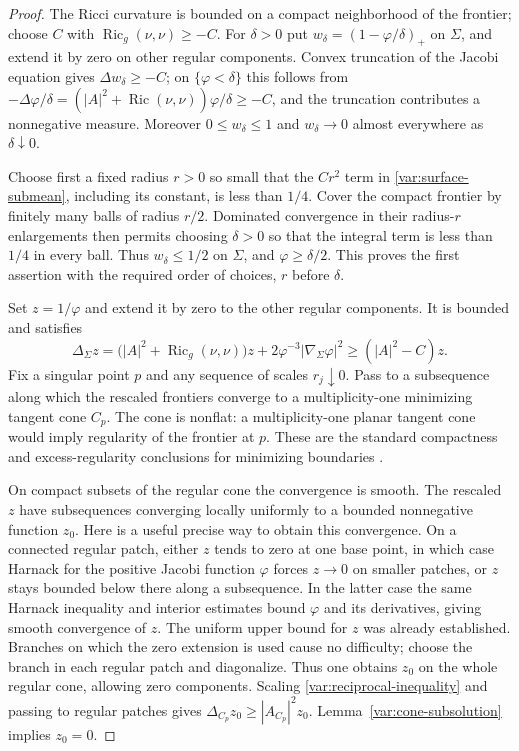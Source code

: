 \begin{proof}
The Ricci curvature is bounded on a compact neighborhood of the
frontier; choose $C$ with $\operatorname{Ric}_g(\nu,\nu)\geq-C$.
For $\delta>0$ put $w_\delta=(1-\varphi/\delta)_+$ on $\Sigma$,
and extend it by zero on other regular components.  Convex
truncation of the Jacobi equation gives
$\Delta w_\delta\geq-C$; on $\{\varphi<\delta\}$ this follows
from $-\Delta\varphi/\delta=(|A|^2+\operatorname{Ric}(\nu,\nu))
\varphi/\delta\geq-C$, and the truncation contributes a nonnegative
measure.  Moreover $0\leq w_\delta\leq1$ and $w_\delta\to0$
almost everywhere as $\delta\downarrow0$.

Choose first a fixed radius $r>0$ so small that the $Cr^2$ term
in \eqref{var:surface-submean}, including its constant, is less
than $1/4$.  Cover the compact frontier by finitely many balls
of radius $r/2$.  Dominated convergence in their radius-$r$
enlargements then permits choosing $\delta>0$ so that the integral
term is less than $1/4$ in every ball.  Thus $w_\delta\leq1/2$
on $\Sigma$, and $\varphi\geq\delta/2$.  This proves the first
assertion with the required order of choices, $r$ before $\delta$.

Set $z=1/\varphi$ and extend it by zero to the other regular
components.  It is bounded and satisfies
\begin{equation}\label{var:reciprocal-inequality}
 \Delta_\Sigma z
   =\bigl(|A|^2+\operatorname{Ric}_g(\nu,\nu)\bigr)z
                  +2\varphi^{-3}|\nabla_\Sigma\varphi|^2
   \geq(|A|^2-C)z.
\end{equation}
Fix a singular point $p$ and any sequence of scales $r_j\downarrow0$.
Pass to a subsequence along which the rescaled frontiers converge
to a multiplicity-one minimizing tangent cone $C_p$.  The cone
is nonflat: a multiplicity-one planar tangent cone would imply
regularity of the frontier at $p$.  These are the standard
compactness and excess-regularity conclusions for minimizing
boundaries \cite{SimonGMT2014}.

On compact subsets of the regular cone the convergence is smooth.
The rescaled $z$ have subsequences converging locally uniformly to
a bounded nonnegative function $z_0$.  Here is a useful precise
way to obtain this convergence.  On a connected regular patch,
either $z$ tends to zero at one base point, in which case Harnack
for the positive Jacobi function $\varphi$ forces $z\to0$ on
smaller patches, or $z$ stays bounded below there along a
subsequence.  In the latter case the same Harnack inequality and
interior estimates bound $\varphi$ and its derivatives, giving
smooth convergence of $z$.  The uniform upper bound for $z$
was already established.  Branches on which the zero extension
is used cause no difficulty; choose the branch in each regular
patch and diagonalize.  Thus one obtains $z_0$ on the whole
regular cone, allowing zero components.
Scaling \eqref{var:reciprocal-inequality} and passing to regular
patches gives $\Delta_{C_p}z_0\geq|A_{C_p}|^2z_0$.
Lemma~\ref{var:cone-subsolution} implies $z_0=0$.


\end{proof}
